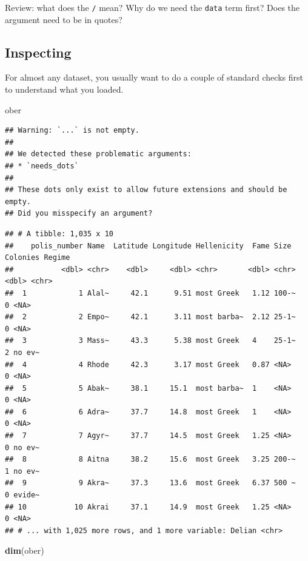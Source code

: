 \documentclass[
]{book}
\newenvironment{Shaded}{\begin{snugshade}}{\end{snugshade}}
\newcommand{\KeywordTok}[1]{\textcolor[rgb]{0.13,0.29,0.53}{\textbf{#1}}}
\newcommand{\NormalTok}[1]{#1}
\theoremstyle{definition}
\theoremstyle{definition}
\theoremstyle{definition}
\theoremstyle{definition}
\theoremstyle{remark}
\begin{document}
Review: what does the \texttt{/} mean? Why do we need the \texttt{data} term first? Does the argument need to be in quotes?

\hypertarget{inspecting}{%
\subsection{Inspecting}\label{inspecting}}

For almost any dataset, you usually want to do a couple of standard checks first to understand what you loaded.

\begin{Shaded}
\begin{Highlighting}[]
\NormalTok{ober}
\end{Highlighting}
\end{Shaded}

\begin{verbatim}
## Warning: `...` is not empty.
## 
## We detected these problematic arguments:
## * `needs_dots`
## 
## These dots only exist to allow future extensions and should be empty.
## Did you misspecify an argument?
\end{verbatim}

\begin{verbatim}
## # A tibble: 1,035 x 10
##    polis_number Name  Latitude Longitude Hellenicity  Fame Size  Colonies Regime
##           <dbl> <chr>    <dbl>     <dbl> <chr>       <dbl> <chr>    <dbl> <chr> 
##  1            1 Alal~     42.1      9.51 most Greek   1.12 100-~        0 <NA>  
##  2            2 Empo~     42.1      3.11 most barba~  2.12 25-1~        0 <NA>  
##  3            3 Mass~     43.3      5.38 most Greek   4    25-1~        2 no ev~
##  4            4 Rhode     42.3      3.17 most Greek   0.87 <NA>         0 <NA>  
##  5            5 Abak~     38.1     15.1  most barba~  1    <NA>         0 <NA>  
##  6            6 Adra~     37.7     14.8  most Greek   1    <NA>         0 <NA>  
##  7            7 Agyr~     37.7     14.5  most Greek   1.25 <NA>         0 no ev~
##  8            8 Aitna     38.2     15.6  most Greek   3.25 200-~        1 no ev~
##  9            9 Akra~     37.3     13.6  most Greek   6.37 500 ~        0 evide~
## 10           10 Akrai     37.1     14.9  most Greek   1.25 <NA>         0 <NA>  
## # ... with 1,025 more rows, and 1 more variable: Delian <chr>
\end{verbatim}

\begin{Shaded}
\begin{Highlighting}[]
\KeywordTok{dim}\NormalTok{(ober)}
\end{Highlighting}
\end{Shaded}
\end{document}
